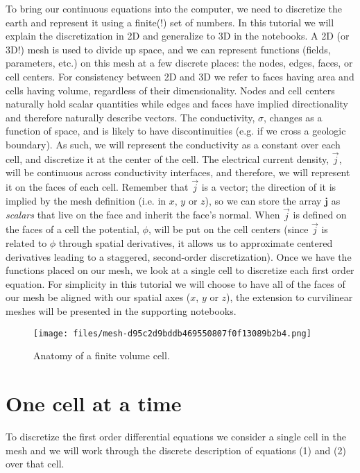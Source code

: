 \documentclass[Journal,InsideFigs,DoubleSpace,12pt,letterpaper]{ascelike-new}
\begin{document}
To bring our continuous equations into the computer, we need to discretize the earth and represent it using a finite(!) set of numbers. In this tutorial we will explain the discretization in 2D and generalize to 3D in the notebooks. A 2D (or 3D!) mesh is used to divide up space, and we can represent functions (fields, parameters, etc.) on this mesh at a few discrete places: the nodes, edges, faces, or cell centers. For consistency between 2D and 3D we refer to faces having area and cells having volume, regardless of their dimensionality. Nodes and cell centers naturally hold scalar quantities while edges and faces have implied directionality and therefore naturally describe vectors. The conductivity, $\sigma$, changes as a function of space, and is likely to have discontinuities (e.g. if we cross a geologic boundary). As such, we will represent the conductivity as a constant over each cell, and discretize it at the center of the cell. The electrical current density, $\vec{j}$, will be continuous across conductivity interfaces, and therefore, we will represent it on the faces of each cell. Remember that $\vec{j}$ is a vector; the direction of it is implied by the mesh definition (i.e. in $x$, $y$ or $z$), so we can store the array $\mathbf{j}$ as \textit{scalars} that live on the face and inherit the face's normal. When $\vec{j}$ is defined on the faces of a cell the potential, $\phi$, will be put on the cell centers (since $\vec{j}$ is related to $\phi$ through spatial derivatives, it allows us to approximate centered derivatives leading to a staggered, second-order discretization). Once we have the functions placed on our mesh, we look at a single cell to discretize each first order equation. For simplicity in this tutorial we will choose to have all of the faces of our mesh be aligned with our spatial axes ($x$, $y$ or $z$), the extension to curvilinear meshes will be presented in the supporting notebooks.

\begin{figure}[!htbp]
\centering
\texttt{[image: files/mesh-d95c2d9bddb469550807f0f13089b2b4.png]}
\caption{Anatomy of a finite volume cell.}
\label{fig-mesh}
\end{figure}

\section{One cell at a time}\label{One cell at a time}

To discretize the first order differential equations we consider a single cell in the mesh and we will work through the discrete description of equations (1) and (2) over that cell.
\end{document}
